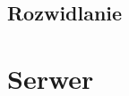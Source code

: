 \documentclass[11pt,a4paper,polish,thesis]{dcsbook}
\begin{document}
\subsection{Rozwidlanie}


\section{Serwer}

\end{document}

